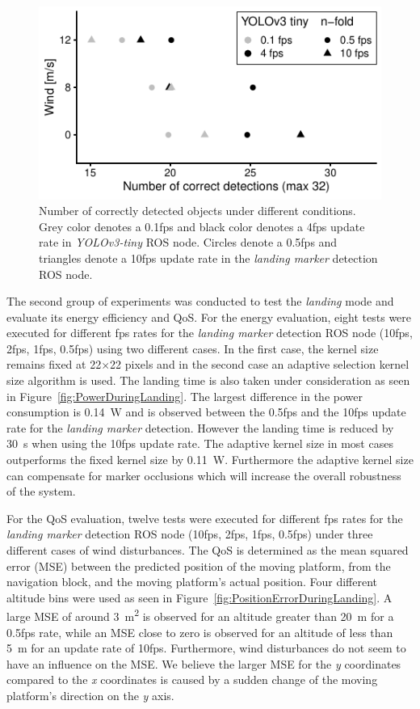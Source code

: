 \documentclass[conference]{IEEEtran}
\begin{document}
\begin{figure}[t]
\centering
\includegraphics{data_visualization/QoSDetection.pdf}
\caption{Number of correctly detected objects
under different conditions. 
Grey color denotes a 0.1fps and black color denotes a 4fps 
update rate in \emph{YOLOv3-tiny} ROS node. 
Circles denote a 0.5fps and triangles denote a 10fps update 
rate in the \emph{landing marker} detection ROS node.}
\label{fig:NCorrectObjectDetections}
\end{figure}


The second group of experiments was conducted to test the \emph{landing} mode
and evaluate its energy efficiency and QoS.
For the energy evaluation, eight tests were executed for different 
fps rates for the \emph{landing marker} detection ROS node 
(10fps, 2fps, 1fps, 0.5fps) using two different cases. 
In the first case, the kernel size remains fixed at 
22$\times$22 pixels and in the second case an adaptive selection 
kernel size algorithm is used. 
%
The landing time is also taken under consideration as seen in
Figure~\ref{fig:PowerDuringLanding}. The largest difference in the
power consumption is \SI{0.14}{\watt} and is observed between the 0.5fps and
the 10fps update rate for the \emph{landing marker} detection. However
the landing time is reduced by \SI{30}{\second} when using the 10fps update
rate. The adaptive kernel size in most cases outperforms the fixed
kernel size by \SI{0.11}{\watt}. Furthermore the adaptive kernel size can
compensate for marker occlusions which will increase the overall
robustness of the system.

For the QoS evaluation, twelve tests were executed for different 
fps rates for the \emph{landing marker} detection ROS node 
(10fps, 2fps, 1fps, 0.5fps) under three different cases of wind
disturbances. The QoS is determined as the  mean squared error (MSE) 
between the predicted position of the moving platform, 
from the navigation block, and the moving platform's actual position. 
Four different altitude bins were used as seen in Figure~\ref{fig:PositionErrorDuringLanding}. A large MSE of around \SI{3}{\square\meter} is observed for an altitude greater than \SI{20}{\meter} for a 0.5fps rate, while an MSE close to zero is observed for an altitude of less than \SI{5}{\meter} for an update rate of 10fps. Furthermore, wind disturbances do not seem to have an influence on the MSE. We believe the larger MSE for the \emph{y} coordinates compared to the \emph{x} coordinates is caused by a sudden change of the moving platform's direction on the \emph{y} axis.
\end{document}
